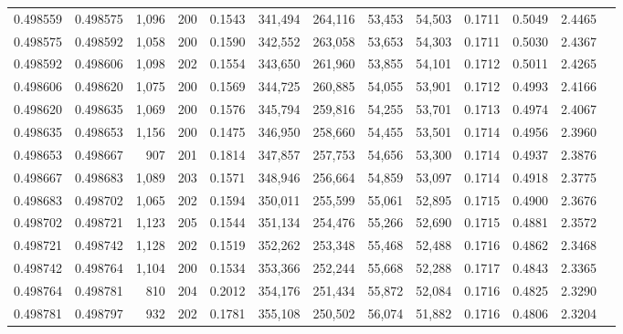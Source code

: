 \begin{tabular}{rrrrrrrrrrrrr}
0.498559 & 0.498575 & 1,096 & 200 &                                     0.1543 & 341,494 & 264,116 &  53,453 &  54,503 & 0.1711 & 0.5049 & 2.4465 \\
0.498575 & 0.498592 & 1,058 & 200 &                                     0.1590 & 342,552 & 263,058 &  53,653 &  54,303 & 0.1711 & 0.5030 & 2.4367 \\
0.498592 & 0.498606 & 1,098 & 202 &                                     0.1554 & 343,650 & 261,960 &  53,855 &  54,101 & 0.1712 & 0.5011 & 2.4265 \\
0.498606 & 0.498620 & 1,075 & 200 &                                     0.1569 & 344,725 & 260,885 &  54,055 &  53,901 & 0.1712 & 0.4993 & 2.4166 \\
0.498620 & 0.498635 & 1,069 & 200 &                                     0.1576 & 345,794 & 259,816 &  54,255 &  53,701 & 0.1713 & 0.4974 & 2.4067 \\
0.498635 & 0.498653 & 1,156 & 200 &                                     0.1475 & 346,950 & 258,660 &  54,455 &  53,501 & 0.1714 & 0.4956 & 2.3960 \\
0.498653 & 0.498667 &   907 & 201 &                                     0.1814 & 347,857 & 257,753 &  54,656 &  53,300 & 0.1714 & 0.4937 & 2.3876 \\
0.498667 & 0.498683 & 1,089 & 203 &                                     0.1571 & 348,946 & 256,664 &  54,859 &  53,097 & 0.1714 & 0.4918 & 2.3775 \\
0.498683 & 0.498702 & 1,065 & 202 &                                     0.1594 & 350,011 & 255,599 &  55,061 &  52,895 & 0.1715 & 0.4900 & 2.3676 \\
0.498702 & 0.498721 & 1,123 & 205 &                                     0.1544 & 351,134 & 254,476 &  55,266 &  52,690 & 0.1715 & 0.4881 & 2.3572 \\
0.498721 & 0.498742 & 1,128 & 202 &                                     0.1519 & 352,262 & 253,348 &  55,468 &  52,488 & 0.1716 & 0.4862 & 2.3468 \\
0.498742 & 0.498764 & 1,104 & 200 &                                     0.1534 & 353,366 & 252,244 &  55,668 &  52,288 & 0.1717 & 0.4843 & 2.3365 \\
0.498764 & 0.498781 &   810 & 204 &                                     0.2012 & 354,176 & 251,434 &  55,872 &  52,084 & 0.1716 & 0.4825 & 2.3290 \\
0.498781 & 0.498797 &   932 & 202 &                                     0.1781 & 355,108 & 250,502 &  56,074 &  51,882 & 0.1716 & 0.4806 & 2.3204 \\

\end{tabular}
